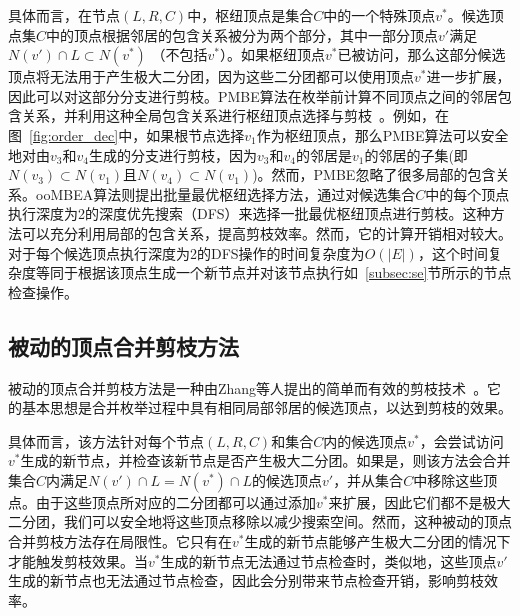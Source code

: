 具体而言，在节点$(L,R,C)$中，枢纽顶点是集合$C$中的一个特殊顶点$v^*$。候选顶点集$C$中的顶点根据邻居的包含关系被分为两个部分，其中一部分顶点$v'$满足$N(v') \cap L \subset N(v^*)$ （不包括$v^*$）。如果枢纽顶点$v^*$已被访问，那么这部分候选顶点将无法用于产生极大二分团，因为这些二分团都可以使用顶点$v^*$进一步扩展，因此可以对这部分分支进行剪枝。PMBE算法在枚举前计算不同顶点之间的邻居包含关系，并利用这种全局包含关系进行枢纽顶点选择与剪枝~\cite{PMBE20}。例如，在图~\ref{fig:order_dec}中，如果根节点选择$v_1$作为枢纽顶点，那么PMBE算法可以安全地对由$v_3$和$v_4$生成的分支进行剪枝，因为$v_3$和$v_4$的邻居是$v_1$的邻居的子集(即$N(v_3)\subset N(v_1)$且$N(v_4)\subset N(v_1)$)。然而，PMBE忽略了很多局部的包含关系。ooMBEA算法则提出批量最优枢纽选择方法，通过对候选集合$C$中的每个顶点执行深度为2的深度优先搜索（DFS）来选择一批最优枢纽顶点进行剪枝。这种方法可以充分利用局部的包含关系，提高剪枝效率。然而，它的计算开销相对较大。对于每个候选顶点执行深度为2的DFS操作的时间复杂度为$O(|E|)$，这个时间复杂度等同于根据该顶点生成一个新节点并对该节点执行如~\ref{subsec:se}节所示的节点检查操作。


\subsection{被动的顶点合并剪枝方法}
\label{subsec:pmp}

被动的顶点合并剪枝方法是一种由Zhang等人提出的简单而有效的剪枝技术~\cite{iMBEA14}。它的基本思想是合并枚举过程中具有相同局部邻居的候选顶点，以达到剪枝的效果。

具体而言，该方法针对每个节点$(L,R,C)$和集合$C$内的候选顶点$v^*$，会尝试访问$v^*$生成的新节点，并检查该新节点是否产生极大二分团。如果是，则该方法会合并集合$C$内满足$N(v') \cap L = N(v^*) \cap L$的候选顶点$v'$，并从集合$C$中移除这些顶点。由于这些顶点所对应的二分团都可以通过添加$v^*$来扩展，因此它们都不是极大二分团，我们可以安全地将这些顶点移除以减少搜索空间。然而，这种被动的顶点合并剪枝方法存在局限性。它只有在$v^*$生成的新节点能够产生极大二分团的情况下才能触发剪枝效果。当$v^*$生成的新节点无法通过节点检查时，类似地，这些顶点$v'$生成的新节点也无法通过节点检查，因此会分别带来节点检查开销，影响剪枝效率。



  
